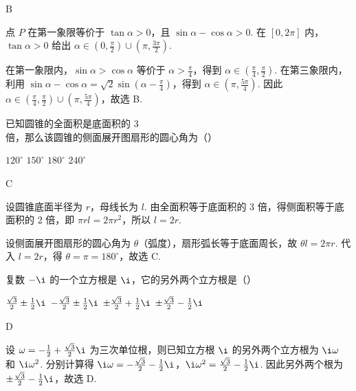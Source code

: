 \begin{answer}
B
\end{answer}

\begin{solution}
点 \(P\) 在第一象限等价于
\(\tan\alpha>0\)，且 \(\sin\alpha-\cos\alpha>0\). 在 \([0,2\pi]\) 内，\(\tan\alpha>0\) 给出
\(\alpha\in(0,\frac{\pi}{2})\cup(\pi,\frac{3\pi}{2})\).

在第一象限内，\(\sin\alpha>\cos\alpha\) 等价于 \(\alpha>\frac{\pi}{4}\)，得到 \(\alpha\in(\frac{\pi}{4},\frac{\pi}{2})\). 在第三象限内，利用
\(\sin\alpha-\cos\alpha=\sqrt{2}\sin(\alpha-\frac{\pi}{4})\)，得到 \(\alpha\in(\pi,\frac{5\pi}{4})\). 因此
\(\alpha\in(\frac{\pi}{4},\frac{\pi}{2})\cup(\pi,\frac{5\pi}{4})\)，故选 B.
\end{solution}

\begin{problem}
已知圆锥的全面积是底面积的 \(3\) 倍，那么该圆锥的侧面展开图扇形的圆心角为（\quad）

\choices
    {\(120^{\circ}\)}
    {\(150^{\circ}\)}
    {\(180^{\circ}\)}
    {\(240^{\circ}\)}
\end{problem}

\begin{answer}
C
\end{answer}

\begin{solution}
设圆锥底面半径为 \(r\)，母线长为 \(l\). 由全面积等于底面积的 \(3\) 倍，得侧面积等于底面积的 \(2\) 倍，即
\(\pi rl=2\pi r^{2}\)，所以 \(l=2r\).

设侧面展开图扇形的圆心角为 \(\theta\)（弧度），扇形弧长等于底面周长，故 \(\theta l=2\pi r\). 代入 \(l=2r\)，得 \(\theta=\pi=180^{\circ}\)，故选 C.
\end{solution}

\begin{problem}
复数 \(-\i\) 的一个立方根是 \(\i\)，它的另外两个立方根是（\quad）

\choices
    {\(\frac{\sqrt{3}}{2} \pm \frac{1}{2}\i\)}
    {\(-\frac{\sqrt{3}}{2} \pm \frac{1}{2}\i\)}
    {\(\pm \frac{\sqrt{3}}{2} + \frac{1}{2}\i\)}
    {\(\pm \frac{\sqrt{3}}{2} - \frac{1}{2}\i\)}
\end{problem}

\begin{answer}
D
\end{answer}

\begin{solution}
设 \(\omega=-\frac{1}{2}+\frac{\sqrt{3}}{2}\i\) 为三次单位根，则已知立方根 \(\i\) 的另外两个立方根为 \(\i\omega\) 和 \(\i\omega^{2}\). 分别计算得
\(\i\omega=-\frac{\sqrt{3}}{2}-\frac{1}{2}\i\)，\(\i\omega^{2}=\frac{\sqrt{3}}{2}-\frac{1}{2}\i\). 因此另外两个根为 \(\pm\frac{\sqrt{3}}{2}-\frac{1}{2}\i\)，故选 D.
\end{solution}

